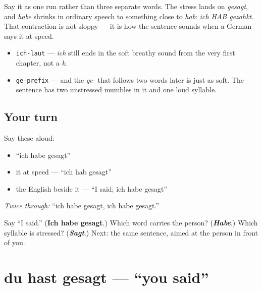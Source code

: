 Say it as one run rather than three separate words. The stress lands on \emph{gesagt}, and \emph{habe} shrinks in ordinary speech to something close to \emph{hab}: \emph{ich HAB gezahkt}. That contraction is not sloppy — it is how the sentence sounds when a German says it at speed.

\begin{sounds}
\begin{itemize}
\raggedright
  \item \texttt{ich-laut} — \emph{ich} still ends in the soft breathy sound from the very first chapter, not a \emph{k}.
  \item \texttt{ge-prefix} — and the \emph{ge-} that follows two words later is just as soft. The sentence has two unstressed mumbles in it and one loud syllable.
\end{itemize}
\end{sounds}

\subsection*{Your turn}
Say these aloud:

\begin{itemize}
\raggedright
  \item \textquotedblleft{}ich habe gesagt\textquotedblright{}
  \item it at speed — \textquotedblleft{}ich hab gesagt\textquotedblright{}
  \item the English beside it — \textquotedblleft{}I said; ich habe gesagt\textquotedblright{}
\end{itemize}

\emph{Twice through:} \textquotedblleft{}ich habe gesagt, ich habe gesagt.\textquotedblright{}

\begin{tcolorbox}[breakable,colback=teal!4,colframe=teal!35!black,title={Before you move on}]
Say \textquotedblleft{}I said.\textquotedblright{} (\textbf{Ich habe gesagt}.) Which word carries the person? (\emph{\textbf{Habe}}.) Which syllable is stressed? (\emph{\textbf{Sagt}}.) Next: the same sentence, aimed at the person in front of you.
\end{tcolorbox}
\section[du hast gesagt]{du hast gesagt — \textquotedblleft{}you said\textquotedblright{}}

\label{lesson:GE-C15-du-hast-gesagt}



